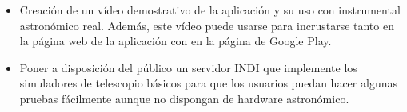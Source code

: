 \begin{itemize}
  \item Creación de un vídeo demostrativo de la aplicación y su uso con instrumental astronómico real. Además, este vídeo puede usarse para incrustarse tanto en la página web de la aplicación con en la página de Google Play.
  
  \item Poner a disposición del público un servidor INDI que implemente los simuladores de telescopio básicos para que los usuarios puedan hacer algunas pruebas fácilmente aunque no dispongan de hardware astronómico.
\end{itemize}